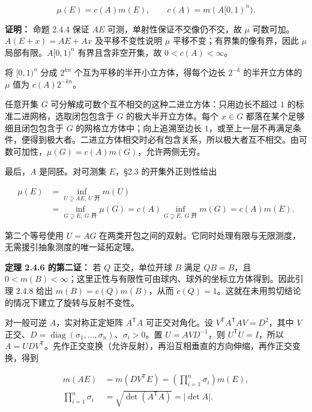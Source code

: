 \documentclass[11pt,a4paper]{article}
\begin{document}
\begin{equation*}
\mu(E)=c(A)m(E),\qquad c(A)=m(A[0,1)^n).
\tag{2.4.12}
\end{equation*}

\textbf{证明：} 命题 2.4.4 保证 \(AE\) 可测，单射性保证不交像仍不交，故
\(\mu\) 可数可加。\(A(E+x)=AE+Ax\) 及平移不变性说明 \(\mu\)
平移不变；有界集的像有界，因此 \(\mu\) 局部有限。\(A[0,1)^n\)
有界且含非空开集，故 \(0<c(A)<\infty\)。

将 \([0,1)^n\) 分成 \(2^{kn}\) 个互为平移的半开小立方体，得每个边长
\(2^{-k}\) 的半开立方体的 \(\mu\) 值为 \(c(A)2^{-kn}\)。

任意开集 \(G\) 可分解成可数个互不相交的这种二进立方体：只用边长不超过
\(1\) 的标准二进网格，选取闭包包含于 \(G\) 的极大半开立方体。每个
\(x\in G\) 都落在某个足够细且闭包包含于 \(G\)
的网格立方体中；向上追溯至边长
\(1\)，或至上一层不再满足条件，便得到极大者。二进立方体相交时必有包含关系，所以极大者互不相交。由可数可加性，\(\mu(G)=c(A)m(G)\)，允许两侧无穷。

最后，\(A\) 是同胚。对可测集 \(E\)，§2.3 的开集外正则性给出

\begin{equation*}
\begin{aligned}
\mu(E)&=\inf_{U\supseteq AE,\ U\text{ 开}}m(U)\\
&=\inf_{G\supseteq E,\ G\text{ 开}}\mu(G)
=c(A)\inf_{G\supseteq E,\ G\text{ 开}}m(G)
=c(A)m(E).
\end{aligned}
\tag{2.4.13}
\end{equation*}

第二个等号使用 \(U=AG\)
在两类开包之间的双射。它同时处理有限与无限测度，无需援引抽象测度的唯一延拓定理。

\textbf{定理 2.4.6 的第二证：} 若 \(Q\) 正交，单位开球 \(B\) 满足
\(QB=B\)，且
\(0<m(B)<\infty\)；这里正性与有限性可由球内、球外的坐标立方体得到。因此引理
2.4.8 给出 \(m(B)=c(Q)m(B)\)，从而
\(c(Q)=1\)。这就在未用剪切结论的情况下建立了旋转与反射不变性。

对一般可逆 \(A\)，实对称正定矩阵 \(A^{\mathsf T}A\) 可正交对角化。设
\(V^{\mathsf T}A^{\mathsf T}AV=D^2\)，其中 \(V\)
正交、\(D=\operatorname{diag}(\sigma_1,\ldots,\sigma_n)\)、\(\sigma_i>0\)。置
\(U=AVD^{-1}\)，则 \(U^{\mathsf T}U=I\)，所以
\(A=UDV^{\mathsf T}\)。先作正交变换（允许反射），再沿互相垂直的方向伸缩，再作正交变换，得到

\begin{equation*}
\begin{aligned}
m(AE)&=m(DV^{\mathsf T}E)
=\left(\prod_{i=1}^n\sigma_i\right)m(E),\\
\prod_{i=1}^n\sigma_i
&=\sqrt{\det(A^{\mathsf T}A)}=|\det A|.
\end{aligned}
\tag{2.4.14}
\end{equation*}
\end{document}
